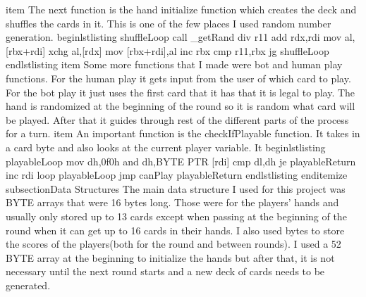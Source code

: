     item The next function is the hand initialize function which creates the deck and shuffles the cards in it. This is one of the few places I used random number generation.
    begin{lstlisting}
shuffleLoop
call _getRand
div r11
add rdx,rdi
mov al,[rbx+rdi]
xchg al,[rdx]
mov [rbx+rdi],al
inc rbx
cmp r11,rbx
jg shuffleLoop
    end{lstlisting}
    item Some more functions that I made were bot and human play functions. For the human play it gets input from the user of which card to play. For the bot play it just uses the first card that it has that it is legal to play. The hand is randomized at the beginning of the round so it is random what card will be played. After that it guides through rest of the different parts of the process for a turn.
    item An important function is the checkIfPlayable function. It takes in a card byte and also looks at the current player variable. It 
begin{lstlisting}
    playableLoop
mov dh,0f0h
and dh,BYTE PTR [rdi]
cmp dl,dh
je playableReturn
inc rdi
loop playableLoop
jmp canPlay
playableReturn
end{lstlisting}
end{itemize}
subsection{Data Structures}
The main data structure I used for this project was BYTE arrays that were 16 bytes long. Those were for the players' hands and usually only stored up to 13 cards except when passing at the beginning of the round when it can get up to 16 cards in their hands. I also used bytes to store the scores of the players(both for the round and between rounds). I used a 52 BYTE array at the beginning to initialize the hands but after that, it is not necessary until the next round starts and a new deck of cards needs to be generated.

